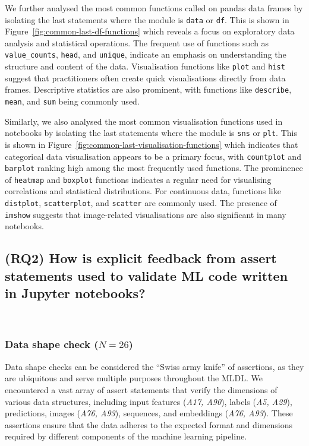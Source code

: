 We further analysed the most common functions called on pandas data frames by isolating the last statements where the module is \lstinline{data} or \lstinline{df}. This is shown in Figure~\ref{fig:common-last-df-functions} which reveals a focus on exploratory data analysis and statistical operations. The frequent use of functions such as \lstinline{value_counts}, \lstinline{head}, and \lstinline{unique}, indicate an emphasis on understanding the structure and content of the data. Visualisation functions like \lstinline{plot} and \lstinline{hist} suggest that practitioners often create quick visualisations directly from data frames. Descriptive statistics are also prominent, with functions like \lstinline{describe}, \lstinline{mean}, and \lstinline{sum} being commonly used.

Similarly, we also analysed the most common visualisation functions used in notebooks by isolating the last statements where the module is \lstinline{sns} or \lstinline{plt}. This is shown in Figure~\ref{fig:common-last-visualisation-functions} which indicates that categorical data visualisation appears to be a primary focus, with \lstinline{countplot} and \lstinline{barplot} ranking high among the most frequently used functions. The prominence of \lstinline{heatmap} and \lstinline{boxplot} functions indicates a regular need for visualising correlations and statistical distributions. For continuous data, functions like \lstinline{distplot}, \lstinline{scatterplot}, and \lstinline{scatter} are commonly used. The presence of \lstinline{imshow} suggests that image-related visualisations are also significant in many notebooks.

\subsection{(RQ2) How is explicit feedback from assert statements used to validate ML code written in Jupyter notebooks?}~\label{sec:result-explicit}

\subsubsection{Data shape check ($N = 26$)}

Data shape checks can be considered the ``Swiss army knife'' of assertions, as they are ubiquitous and serve multiple purposes throughout the MLDL. We encountered a vast array of assert statements that verify the dimensions of various data structures, including input features (\emph{A17, A90}), labels (\emph{A5, A29}), predictions, images (\emph{A76, A93}), sequences, and embeddings (\emph{A76, A93}). These assertions ensure that the data adheres to the expected format and dimensions required by different components of the machine learning pipeline.


